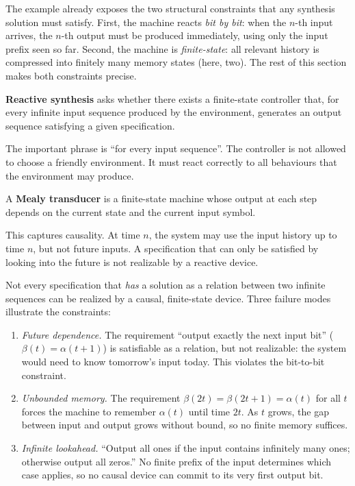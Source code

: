 The example already exposes the two structural constraints that any
synthesis solution must satisfy.  First, the machine reacts \emph{bit by
bit}: when the $n$-th input arrives, the $n$-th output must be produced
immediately, using only the input prefix seen so far.  Second, the
machine is \emph{finite-state}: all relevant history is compressed into
finitely many memory states (here, two).  The rest of this section makes
both constraints precise.

\begin{definition}
\label{def:reactive-synthesis}
\textbf{Reactive synthesis} asks whether there exists a finite-state
controller that, for every infinite input sequence produced by the
environment, generates an output sequence satisfying a given
specification.
\end{definition}

The important phrase is ``for every input sequence''.  The controller is
not allowed to choose a friendly environment.  It must react correctly
to all behaviours that the environment may produce.

\begin{definition}
\label{def:mealy-transducer}
A \textbf{Mealy transducer} is a finite-state machine whose output at
each step depends on the current state and the current input symbol.
\end{definition}

This captures causality.  At time $n$, the system may use the input
history up to time $n$, but not future inputs.  A specification that can
only be satisfied by looking into the future is not realizable by a
reactive device.

Not every specification that \emph{has} a solution as a relation between
two infinite sequences can be realized by a causal, finite-state device.
Three failure modes illustrate the constraints:

\begin{example}
\label{ex:sat-vs-realizable}
\leavevmode
\begin{enumerate}[nosep,label=(\alph*)]
  \item \emph{Future dependence.}
        The requirement ``output exactly the next input bit''
        ($\beta(t)=\alpha(t+1)$) is satisfiable as a relation, but not
        realizable: the system would need to know tomorrow's input
        today.  This violates the bit-to-bit constraint.
  \item \emph{Unbounded memory.}
        The requirement $\beta(2t)=\beta(2t+1)=\alpha(t)$ for all $t$
        forces the machine to remember $\alpha(t)$ until time $2t$.  As
        $t$ grows, the gap between input and output grows without bound,
        so no finite memory suffices.
  \item \emph{Infinite lookahead.}
        ``Output all ones if the input contains infinitely many ones;
        otherwise output all zeros.''  No finite prefix of the input
        determines which case applies, so no causal device can commit to
        its very first output bit.
\end{enumerate}
\end{example}

